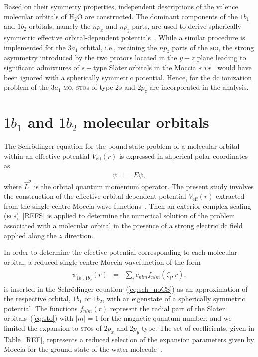 Based on their symmetry properties, independent descriptions of the
valence molecular orbitals of H$_{2}$O are constructed. The dominant
components of the $1b_{1}$ and $1b_{2}$ orbitals, namely the $np_{x}$
and $np_{y}$ parts, are used to derive spherically symmetric effective
orbital-dependent potentials~\cite{sarias_2016}. While a similar
procedure is implemented for the $3a_{1}$ orbital, i.e., retaining the
$np_{z}$ parts of the \textsc{mo}, the strong asymmetry introduced by
the two protons located in the $y-z$ plane leading to significant
admixtures of $s-$type Slater orbitals in the Moccia
\textsc{sto}s~\cite{Moccia_1964} would have been ignored with a
spherically symmetric potential. Hence, for the dc ionization problem
of the $3a_{1}$ \textsc{mo}, \textsc{sto}s of type $2s$ and $2p_{z}$
are incorporated in the analysis.



\section{$1b_{1}$ and $1b_{2}$ molecular orbitals}
\label{ch:1b1_1b2}

The Schr\"{o}dinger equation for the bound-state problem of a
molecular orbital within an effective potential $V_{\mathrm{eff}}(r)$
is expressed in shperical polar coordinates as
%
\begin{eqnarray}
  [ -\frac{1}{2} \frac{d^2}{dr^2} + \frac{\hat{L}^2}{2r^2} + V_{\rm{eff}}(r)] \psi
  & = & E\psi,
\label{eq:sch_noCS}
\end{eqnarray}
%
where $\hat{L}^{2}$ is the orbital quantum momentum operator. The
present study involves the construction of the effective
orbital-dependent potential $V_{\mathrm{eff}}(r)$ extracted from the
single-centre Moccia wave functions~\cite{Moccia_1964}. Then an
exterior complex scaling (\textsc{ecs})~[REFS] is applied to determine
the numerical solution of the problem associated with a molecular
orbital in the presence of a strong electric dc field applied along
the $z$ direction.

In order to determine the efective potential corresponding to each
molecular orbital, a reduced single-centre Moccia wavefunction of the
form
%
\begin{eqnarray}
  \begin{split}
    \psi_{1b_{1},1b_{2}}(r) & = & \sum\limits_{i} c_{nlm} f_{nlm}(\zeta_{i}, r),
    \label{eq:sto_1b1_1b2}
  \end{split}
\end{eqnarray}
%
is inserted in the Schr\"{o}dinger equation~(\ref{eq:sch_noCS}) as an
approximation of the respective orbital, $1b_{1}$ or $1b_{2}$, with an
eigenstate of a spherically symmetric potential. The functions
$f_{nlm}(r)$ represent the radial part of the Slater
orbitals~(\ref{eq:sto}) with $|m|=1$ for the magnetic quantum number,
and we limited the expansion to \textsc{sto}s of $2p_{x}$ and $2p_{y}$
type. The set of coefficients, given in Table~[REF], represents a
reduced selection of the expansion parameters given by Moccia for the
ground state of the water molecule~\cite{Moccia_1964}.

